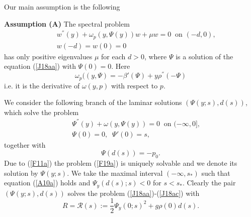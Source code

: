 \documentclass[a4paper,reqno,12pt]{amsart}
\theoremstyle{plain}
\theoremstyle{definition}
\numberwithin{equation}{section}
\begin{document}
Our main assumption is the following

\noindent
{\bf Assumption (A)} The spectral problem
\begin{eqnarray}\label{J18c}
&&w^{''}(y)+\omega_p(y,\Psi(y))w+\mu w=0\;\;\mbox{on $(-d,0)$},\nonumber\\
&&w(-d)=w(0)=0
\end{eqnarray}
has only positive eigenvalues $\mu$ for each $d>0$, where $\Psi$ is a solution of the equation (\ref{J18aa}) with $\Psi(0)=0$. Here
\begin{equation}\label{Ma9a}
\omega_p((y,\Psi)=-\beta'(\Psi)+y\rho^{''}(-\Psi)
\end{equation}
i.e. it is the derivative of $\omega(y,p)$ with respect to $p$.

We consider the following branch of the laminar solutions $(\Psi(y;s),d(s))$, which solve the problem
\begin{eqnarray}\label{F19a}
&&\Psi^{''}(y)+\omega(y,\Psi(y))=0\;\;\mbox{on $(-\infty,0]$},\nonumber\\
&&\Psi(0)=0,\;\;\Psi'(0)=s,
\end{eqnarray}
together with
\begin{equation}\label{A10a}
\Psi(d(s))=-p_0.
\end{equation}
Due to (\ref{F11a}) the problem (\ref{F19a}) is uniquely solvable and we denote its solution by $\Psi(y;s)$. We take the maximal interval $(-\infty,s_*)$ such that equation (\ref{A10a}) holds and $\Psi_y(d(s);s)<0$ for $s<s_*$. Clearly the pair $(\Psi(y;s),d(s))$ solves the problem (\ref{J18aa})-(\ref{J18ac}) with
\begin{equation}\label{A17a}
R={\mathcal R}(s):=\frac{1}{2}\Psi_y(0;s)^2+g\rho(0)d(s).
\end{equation}
\end{document}
